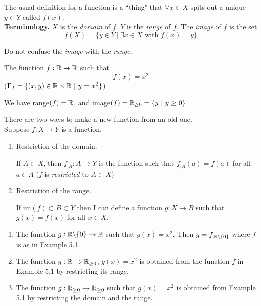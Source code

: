 \documentclass[twoside]{scrartcl}
\begin{document}
The usual definition for a function is a ``thing" that $\forall x \in X$ spits out a unique $y \in Y$ called $f(x)$.\\

\textbf{Terminology.} $X$ is the \emph{domain} of $f$. $Y$ is the \emph{range} of $f$. The \emph{image} of $f$ is the set 
\[f(X) = \{y \in Y ~|~ \exists x \in X \text{ with } f(x) = y\}\]\vspace*{-10pt}
\begin{warning}
Do not confuse the \emph{image} with the \emph{range.}	
\end{warning}\vspace*{15pt}


\begin{example}
The function $f: \mathbb{R} \to \mathbb{R}$ such that \[f(x) = x^2\] ($\Gamma_f = \{(x,y) \in \mathbb{R} \times \mathbb{R} ~|~ y = x^2\}$)

We have range$(f) = \mathbb{R}$, and image$(f) = \mathbb{R}_{\geq 0} = \{y ~|~ y \geq 0\}$	
\end{example}

There are two ways to make a new function from an old one.\\Suppose $f: X \to Y$ is a function. 

\begin{enumerate}
\item Restriction of the domain. 

If $A \subset X$, then $f_{|A} : A \to Y$ is the function such that $f_{|A}(a) = f(a)$ for all $a \in A$ ($f$ is \emph{restricted} to $A \subset X$)\\

\item Restriction of the range. 

If im$(f) \subset B \subset Y$ then I can define a function $g: X \to B$ such that $g(x) = f(x)$ for all $x \in X$. \\
\end{enumerate}

\begin{examples}
\begin{enumerate}
\item The function $g: \mathbb{R} \backslash\{0\} \to \mathbb{R}$ such that $g(x) = x^2$. Then $g = f_{|\mathbb{R}\backslash\{0\}}$ where $f$ is as in Example 5.1. 
\item The function $g: \mathbb{R} \to \mathbb{R}_{\geq 0}$, $g(x) = x^2$ is obtained from the function $f$ in Example 5.1 by restricting its range. 
\item The function $g: \mathbb{R}_{\geq 0} \to \mathbb{R}_{\geq 0}$ such that $g(x) = x^2$ is obtained from Example 5.1 by restricting the domain and the range. 
\end{enumerate}	
\end{examples}\vspace*{5pt}
\end{document}
